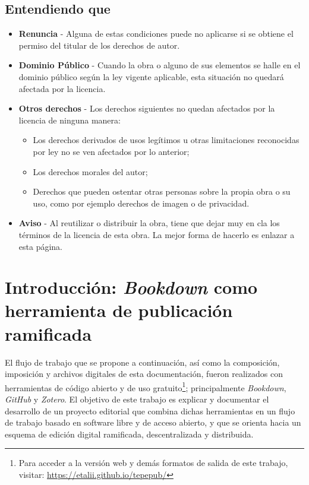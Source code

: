 \documentclass[
]{book}
\begin{document}
\hypertarget{entendiendo-que}{%
\section*{Entendiendo que}\label{entendiendo-que}}

\begin{itemize}
\item
  \textbf{Renuncia} - Alguna de estas condiciones puede no aplicarse si se obtiene
  el permiso del titular de los derechos de autor.
\item
  \textbf{Dominio Público} - Cuando la obra o alguno de sus elementos se halle en
  el dominio público según la ley vigente aplicable, esta situación no quedará
  afectada por la licencia.
\item
  \textbf{Otros derechos} - Los derechos siguientes no quedan afectados por
  la licencia de ninguna manera:

  \begin{itemize}
  \item
    Los derechos derivados de usos legítimos u otras limitaciones
    reconocidas por ley no se ven afectados por lo anterior;
  \item
    Los derechos morales del autor;
  \item
    Derechos que pueden ostentar otras personas sobre la propia obra o
    su uso, como por ejemplo derechos de imagen o de privacidad.
  \end{itemize}
\item
  \textbf{Aviso} - Al reutilizar o distribuir la obra, tiene que dejar muy en cla
  los términos de la licencia de esta obra. La mejor forma de hacerlo es
  enlazar a esta página.
\end{itemize}

\hypertarget{intro}{%
\chapter{\texorpdfstring{Introducción: \emph{Bookdown} como herramienta de publicación ramificada}{Introducción: Bookdown como herramienta de publicación ramificada}}\label{intro}}

El flujo de trabajo que se propone a continuación, así como la composición, imposición y archivos digitales de esta documentación, fueron realizados con herramientas de código abierto y de uso gratuito\footnote{Para acceder a la versión web y demás formatos de salida de este trabajo, visitar: \url{https://etalii.github.io/tepepub/}}; principalmente \emph{Bookdown}, \emph{GitHub} y \emph{Zotero}. El objetivo de este trabajo es explicar y documentar el desarrollo de un proyecto editorial que combina dichas herramientas en un flujo de trabajo basado en software libre y de acceso abierto, y que se orienta hacia un esquema de edición digital ramificada, descentralizada y distribuida.
\end{document}
